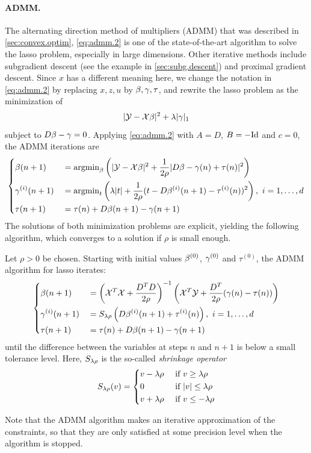 \paragraph{ADMM.}
The  alternating direction method of multipliers (ADMM)  that was described in  \cref{sec:convex.optim},  \cref{eq:admm.2} is one of the  state-of-the-art algorithm to solve the lasso problem, especially in large dimensions. Other iterative methods include subgradient descent (see the example in \cref{sec:subg.descent}) and proximal gradient descent. Since $x$ has a different meaning here, we change the notation in \eqref{eq:admm.2} by replacing $x, z, u$ by $\beta, \gamma, \tau$, and rewrite the lasso problem as the minimization of 
\[
|{\mathcal Y} - {\mathcal X}\beta|^2 + \lambda |\gamma|_1
\]
subject to $D\beta - \gamma = 0$. Applying \eqref{eq:admm.2} with $A=D$, $B=-\Id$ and $c=0$, the ADMM iterations are
\[
\left\{
\begin{aligned}
&\beta(n+1) &&= \mathrm{argmin}_{\beta}  \left(|{\mathcal Y} - {\mathcal X}\beta|^2 + \frac 1{2\rho} | D\beta - \gamma(n) +\tau(n)|^2\right)\\
&\gamma^{(i)}(n+1) &&= \mathrm{argmin}_t \left(\lambda |t| + \frac{1}{2\rho} (t - D\beta^{(i)}(n+1) - \tau^{(i)}(n))^2 \right), \ i=1, \ldots, d\\
&\tau(n+1) &&=  \tau(n) + D\beta(n+1) - \gamma(n+1)
\end{aligned}
\right.
\]
The solutions of both minimization problems are explicit, yielding the following algorithm, which converges to a solution if $\rho$ is small enough.
\begin{algorithm}
\label{alg:admm.lasso}
Let $\rho>0$ be chosen. Starting with initial values $\beta^{(0)}$, $\gamma^{(0)}$ and $\tau^{(0)}$, the ADMM algorithm for lasso iterates: 
\[
\left\{
\begin{aligned}
&\be(n+1) 
&&= \left(\CX^T\CX + \frac{D^TD}{2\rho}\right)^{-1} \left(\CX^T\CY + \frac{D^T}{2\rho} (\ga(n) - \tau(n))\right)\\
&\ga^{(i)}(n+1) 
&& = S_{\la\rho}\left(D\be^{(i)}(n+1) + \tau^{(i)}(n)\right),\ i=1, \ldots, d\\
&\tau(n+1) &&=  \tau(n) + D\be(n+1) - \ga(n+1)
\end{aligned}
\right.
\]
until the difference between the variables at steps $n$ and $n+1$ is below a small tolerance level. 
Here,  $S_{\lambda\rho}$ is the so-called {\em shrinkage operator}
\[
S_{\lambda\rho}(v) = \left\{
\begin{aligned}
&v - \lambda\rho &&\text{ if } v \geq \lambda\rho\\
&0 &&\text{ if } |v| \leq \lambda\rho\\
&v + \lambda\rho &&\text{ if } v \leq -\lambda\rho
\end{aligned}
\right.
\]
\end{algorithm}
Note that the ADMM algorithm makes an iterative approximation of the constraints, so that they are only satisfied at some precision level when the algorithm is stopped. 


